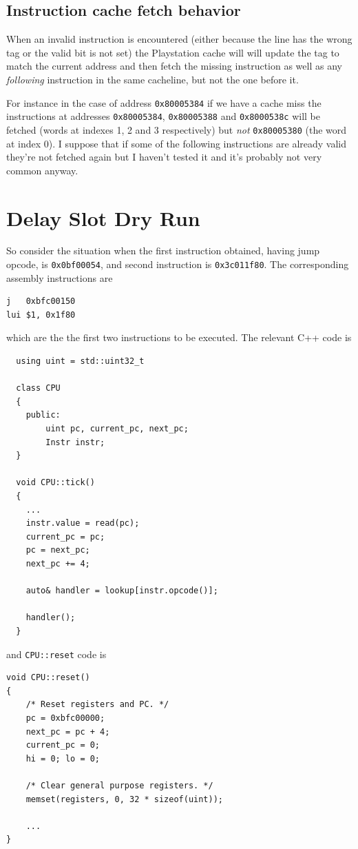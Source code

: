 \documentclass[a4paper]{article}
\newcommand{\code}[1] {\texttt{#1}}
\begin{document}
\subsection{Instruction cache fetch behavior}

When an invalid instruction is encountered (either because the line
has the wrong tag or the valid bit is not set) the Playstation cache
will will update the tag to match the current address and then fetch
the missing instruction as well as any \emph{following} instruction in
the same cacheline, but not the one before it.

For instance in the case of address \code{0x80005384} if we have a
cache miss the instructions at addresses \code{0x80005384},
\code{0x80005388} and \code{0x8000538c} will be fetched (words at
indexes 1, 2 and 3 respectively) but \emph{not} \code{0x80005380} (the
word at index 0). I suppose that if some of the following instructions
are already valid they're not fetched again but I haven't tested it
and it's probably not very common anyway.

\appendix
\section{Delay Slot Dry Run}
\label{appendix:delayshotdryrun}
So consider the situation when the first instruction obtained, having
jump opcode, is \code{0x0bf00054}, and second instruction is \code{0x3c011f80}.
The corresponding assembly instructions are
\begin{lstlisting}[language=assembly]
j   0xbfc00150
lui $1, 0x1f80
\end{lstlisting}
which are the the first two instructions to be executed.  The relevant C++
code is
\begin{lstlisting}
  using uint = std::uint32_t

  class CPU
  {
    public:
        uint pc, current_pc, next_pc;
        Instr instr;
  }
      
  void CPU::tick()
  {
    ...
    instr.value = read(pc);
    current_pc = pc;
    pc = next_pc;
    next_pc += 4;

    auto& handler = lookup[instr.opcode()];

    handler();
  }
\end{lstlisting}
and \code{CPU::reset} code is
\begin{lstlisting}
void CPU::reset()
{
	/* Reset registers and PC. */
	pc = 0xbfc00000;
	next_pc = pc + 4;
	current_pc = 0;
	hi = 0; lo = 0;
	
	/* Clear general purpose registers. */
	memset(registers, 0, 32 * sizeof(uint));
	
	...
}
\end{lstlisting}
\end{document}
